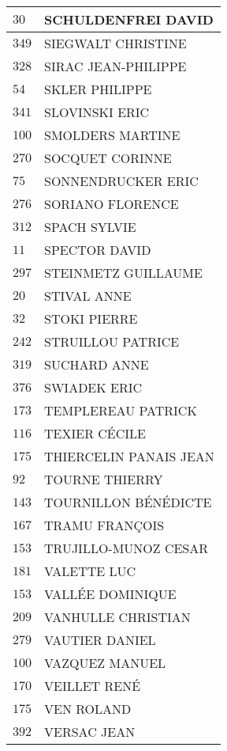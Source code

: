 \begin{xltabular}{\linewidth}{|l|X|}
    \hline
    $30$ & SCHULDENFREI DAVID \\
    \hline
    $349$ & SIEGWALT CHRISTINE \\
    \hline
    $328$ & SIRAC JEAN-PHILIPPE \\
    \hline
    $54$ & SKLER PHILIPPE \\
    \hline
    $341$ & SLOVINSKI ERIC \\
    \hline
    $100$ & SMOLDERS MARTINE \\
    \hline
    $270$ & SOCQUET CORINNE \\
    \hline
    $75$ & SONNENDRUCKER ERIC \\
    \hline
    $276$ & SORIANO FLORENCE \\
    \hline
    $312$ & SPACH SYLVIE \\
    \hline
    $11$ & SPECTOR DAVID \\
    \hline
    $297$ & STEINMETZ GUILLAUME \\
    \hline
    $20$ & STIVAL ANNE \\
    \hline
    $32$ & STOKI PIERRE \\
    \hline
    $242$ & STRUILLOU PATRICE \\
    \hline
    $319$ & SUCHARD ANNE \\
    \hline
    $376$ & SWIADEK ERIC \\
    \hline
    $173$ & TEMPLEREAU PATRICK \\
    \hline
    $116$ & TEXIER CÉCILE \\
    \hline
    $175$ & THIERCELIN PANAIS JEAN \\
    \hline
    $92$ & TOURNE THIERRY \\
    \hline
    $143$ & TOURNILLON BÉNÉDICTE \\
    \hline
    $167$ & TRAMU FRANÇOIS \\
    \hline
    $153$ & TRUJILLO-MUNOZ CESAR \\
    \hline
    $181$ & VALETTE LUC \\
    \hline
    $153$ & VALLÉE DOMINIQUE \\
    \hline
    $209$ & VANHULLE CHRISTIAN \\
    \hline
    $279$ & VAUTIER DANIEL \\
    \hline
    $100$ & VAZQUEZ MANUEL \\
    \hline
    $170$ & VEILLET RENÉ \\
    \hline
    $175$ & VEN ROLAND \\
    \hline
    $392$ & VERSAC JEAN \\

\end{xltabular}
